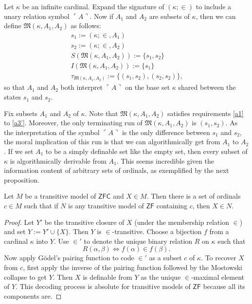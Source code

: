 \documentclass[12pt]{article}
\numberwithin{equation}{section}
\begin{document}
\begin{ex}\label{ex21}
Let $\kappa$ be an infinite cardinal. Expand the signature of $(\kappa; \in)$ to include a unary relation symbol $\ulcorner A \urcorner$. Now if $A_1$ and $A_2$ are subsets of $\kappa$, then we can define $\mathfrak{M}(\kappa, A_1, A_2)$ as follows:
\begin{gather*}
    s_1 := (\kappa; \in, A_1) \\
    s_2 := (\kappa; \in, A_2) \\
    S(\mathfrak{M}(\kappa, A_1, A_2)) := \{s_1, s_2\} \\
    I(\mathfrak{M}(\kappa, A_1, A_2)) := \{s_1\} \\
    \tau_{\mathfrak{M}(\kappa, A_1, A_2)} := \{(s_1, s_2), (s_2, s_2)\} \text{,}
\end{gather*}
so that $A_1$ and $A_2$ both interpret $\ulcorner A \urcorner$ on the base set $\kappa$ shared between the states $s_1$ and $s_2$. 
\end{ex}

Fix subsets $A_1$ and $A_2$ of $\kappa$. Note that $\mathfrak{M}(\kappa, A_1, A_2)$ satisfies requirements \ref{a1} to \ref{a3'}. Moreover, the only terminating run of $\mathfrak{M}(\kappa, A_1, A_2)$ is $(s_1, s_2)$. As the interpretation of the symbol $\ulcorner A \urcorner$ is the only difference between $s_1$ and $s_2$, the moral implication of this run is that we can algorithmically get from $A_1$ to $A_2$. If we set $A_1$ to be a simply definable set like the empty set, then every subset of $\kappa$ is algorithmically derivable from $A_1$. This seems incredible given the information content of arbitrary sets of ordinals, as exemplified by the next proposition.

\begin{prop}\label{prop22}
Let $M$ be a transitive model of $\mathsf{ZFC}$ and $X \in M$. Then there is a set of ordinals $c \in M$ such that if $N$ is any transitive model of $\mathsf{ZF}$ containing $c$, then $X \in N$. 
\end{prop}

\begin{proof}
Let $Y'$ be the transitive closure of $X$ (under the membership relation $\in$) and set $Y := Y' \cup \{X\}$. Then $Y$ is $\in$-transitive. Choose a bijection $f$ from a cardinal $\kappa$ into $Y$. Use $\in'$ to denote the unique binary relation $R$ on $\kappa$ such that
\begin{equation*}
    R(\alpha, \beta) \iff f(\alpha) \in f(\beta) \text{.}
\end{equation*}
Now apply G\"{o}del's pairing function to code $\in'$ as a subset $c$ of $\kappa$. To recover $X$ from $c$, first apply the inverse of the pairing function followed by the Mostowski collapse to get $Y$. Then $X$ is definable from $Y$ as the unique $\in$-maximal element of $Y$. This decoding process is absolute for transitive models of $\mathsf{ZF}$ because all its components are.
\end{proof}
\end{document}
